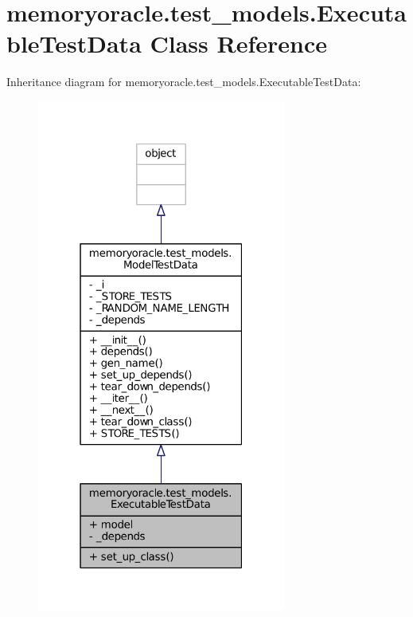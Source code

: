 \hypertarget{classmemoryoracle_1_1test__models_1_1ExecutableTestData}{}\section{memoryoracle.\+test\+\_\+models.\+Executable\+Test\+Data Class Reference}
\label{classmemoryoracle_1_1test__models_1_1ExecutableTestData}


Inheritance diagram for memoryoracle.\+test\+\_\+models.\+Executable\+Test\+Data\+:\nopagebreak
\begin{figure}[H]
\begin{center}
\leavevmode
\includegraphics[width=232pt]{classmemoryoracle_1_1test__models_1_1ExecutableTestData__inherit__graph}
\end{center}
\end{figure}



